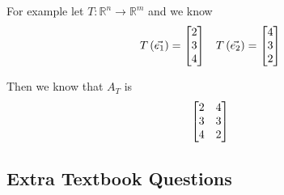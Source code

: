 \documentclass[11pt]{book}
\begin{document}
For example let $T : \mathbb{R} ^{n}  \to \mathbb{R} ^{m} $ and we know
\begin{align*}
    T\left(\vec{e_1} \right)= \begin{bmatrix} 2 \\ 3 \\ 4 \end{bmatrix}  && T\left(\vec{e_2} \right)= \begin{bmatrix} 4 \\ 3 \\ 2 \end{bmatrix} 
\end{align*}

Then we know that $A_{T} $ is
\[
\begin{bmatrix} 2 & 4 \\ 3 & 3 \\ 4 & 2 \end{bmatrix}
\]






\subsection{Extra Textbook Questions}%
\label{sub:extra_textbook_questions}
\end{document}
